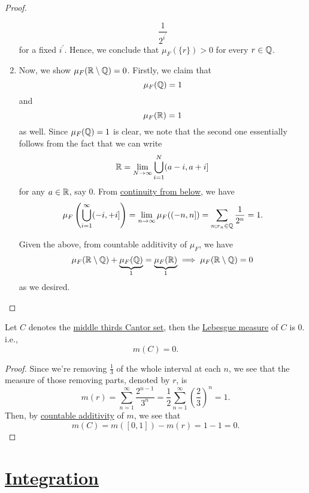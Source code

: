 \begin{proof}
\begin{enumerate}
		      \[
			      \frac{1}{2^{i ^\prime }}
		      \]
		      for a fixed \(i ^\prime \). Hence, we conclude that \(\mu _{F}(\{r\}) > 0\) for every \(r\in\mathbb{\MakeUppercase{q}} \).
		\item Now, we show \(\mu _{F}(\mathbb{\MakeUppercase{r}} \setminus \mathbb{\MakeUppercase{q}} ) = 0\). Firstly, we claim that
		      \[
			      \mu _{F}(\mathbb{\MakeUppercase{q}} ) = 1
		      \]
		      and
		      \[
			      \mu _{F}(\mathbb{\MakeUppercase{r}} ) = 1
		      \]
		      as well. Since \(\mu _{F}(\mathbb{\MakeUppercase{q}} ) = 1\) is clear, we note that the second one essentially follows from the fact that we can write
		      \[
			      \mathbb{\MakeUppercase{r}} = \lim\limits_{N \to \infty} \bigcup\limits_{i=1}^{N} (a-i, a+i]
		      \]
		      for any \(a\in\mathbb{\MakeUppercase{r}} \), say \(0\). From \hyperref[thm:measure-space-continuity-from-below]{continuity from below}, we have
		      \[
			      \mu _{F}\left(\bigcup\limits_{i=1}^{\infty} (-i, +i]\right) = \lim\limits_{n \to \infty} \mu _{F}((-n, n]) = \sum\limits_{n;r_{n}\in\mathbb{\MakeUppercase{q}} }\frac{1}{2^n} = 1.
		      \]

		      \par Given the above, from countable additivity of \(\mu _{F}\), we have
		      \[
			      \mu _{F}(\mathbb{\MakeUppercase{r}} \setminus \mathbb{\MakeUppercase{q}} ) + \underbrace{\mu _{F}(\mathbb{\MakeUppercase{q}} )}_{1} = \underbrace{\mu _{F}(\mathbb{\MakeUppercase{r}} )}_{1} \implies \mu _{F}(\mathbb{\MakeUppercase{r}} \setminus \mathbb{\MakeUppercase{q}} ) = 0
		      \]
		      as we desired.
	\end{enumerate}
\end{proof}

\begin{lemma}\label{lma:Cantor-set-has-measure-0}
	Let \(C\) denotes the \hyperref[eg:lec8:Cantor-set]{middle thirds Cantor set}, then the \hyperref[def:Lebesgue-measure]{Lebesgue measure} of \(C\) is \(0\). i.e.,
	\[
		m(C) = 0.
	\]
\end{lemma}
\begin{proof}
	Since we're removing \(\frac{1}{3}\) of the whole interval at each \(n\), we see that the measure of those removing parts, denoted by \(r\), is
	\[
		m(r) = \sum\limits_{n=1}^{\infty} \frac{2^{n-1}}{3^n} = \frac{1}{2}\sum\limits_{n=1}^{\infty} \left(\frac{2}{3}\right)^n = 1.
	\]
	Then, by \hyperref[def:measure]{countable additivity} of \(m\), we see that
	\[
		m(C) = m([0, 1]) - m(r) = 1 - 1 = 0.
	\]
\end{proof}

\section{\hyperref[ch:Integration]{Integration}}
